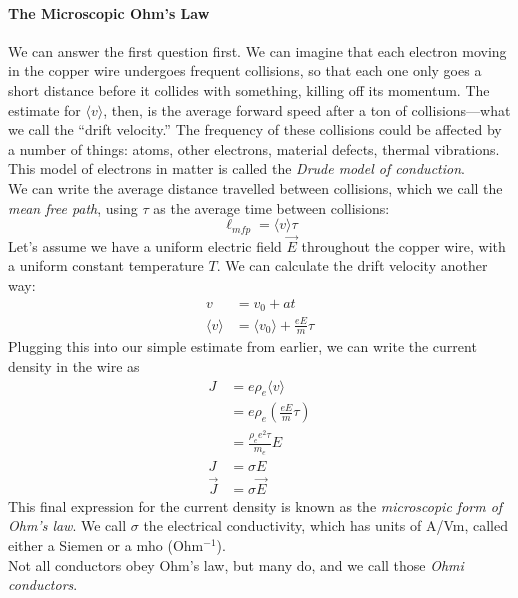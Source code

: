 \documentclass[a4paper]{article}
\begin{document}
\paragraph{The Microscopic Ohm's Law}
We can answer the first question first. We can imagine that each electron
moving in the copper wire undergoes frequent collisions, so that each one
only goes a short distance before it collides with something, killing off its
momentum. The estimate for $\langle v \rangle$, then, is the average forward
speed after a ton of collisions---what we call the ``drift velocity.''
The frequency of these collisions could be affected by a number of things:
atoms, other electrons, material defects, thermal vibrations. This model of
electrons in matter is called the \emph{Drude model of conduction}.\\
We can write the average distance travelled between collisions, which we call
the \emph{mean free path}, using $\tau$ as the average time between collisions:
\[ \ell_{mfp} = \langle v\rangle \tau \]
Let's assume we have a uniform electric field $\vec{E}$ throughout the copper
wire, with a uniform constant temperature $T$. We can calculate the drift
velocity another way:
\begin{align*}
	v &= v_0 + at\\
	\langle v\rangle &= \langle v_0\rangle + \frac{eE}{m}\tau
\end{align*}
Plugging this into our simple estimate from earlier, we can write the current
density in the wire as
\begin{align*}
	J &= e\rho_e\langle v\rangle\\
	  &= e\rho_e\left(\frac{eE}{m}\tau\right)\\
	  &= \frac{\rho_e e^2\tau}{m_e}E\\
	J &= \sigma E\\
	\vec{J} &= \sigma \vec{E}
\end{align*}
This final expression for the current density is known as the \emph{microscopic
form of Ohm's law}. We call $\sigma$ the electrical conductivity, which has
units of A/Vm, called either a Siemen or a mho (Ohm$^{-1}$).\\
Not all conductors obey Ohm's law, but many do, and we call those \emph{Ohmi
conductors}.
\end{document}
